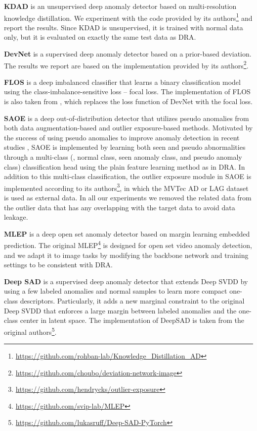 \documentclass[10pt,twocolumn,letterpaper]{article}
\begin{document}
{\noindent\textbf{KDAD} \cite{salehi2021multiresolution} is an unsupervised deep anomaly detector based on multi-resolution knowledge distillation. We experiment with the code provided by its authors\footnote{\url{https://github.com/rohban-lab/Knowledge\_Distillation\_AD}} and report the results. Since KDAD is unsupervised, it is trained with normal data only, but it is evaluated on exactly the same test data as DRA.


\noindent\textbf{DevNet} \cite{pang2019deep,pang2021explainable} is a supervised deep anomaly detector based on a prior-based deviation. The results we report are based on the implementation provided by its authors\footnote{\url{https://github.com/choubo/deviation-network-image}}.


\noindent\textbf{FLOS} \cite{lin2017focalloss} is a deep imbalanced classifier that learns a binary classification model using the class-imbalance-sensitive loss -- focal loss. The implementation of FLOS is also taken from \cite{pang2021explainable}, which replaces the loss function of DevNet with the focal loss.


\noindent\textbf{SAOE} is a deep out-of-distribution detector that utilizes pseudo anomalies from both data augmentation-based and outlier exposure-based methods. Motivated by the success of using pseudo anomalies to improve anomaly detection in recent studies \cite{tack2020csi,li2021cutpaste}, SAOE is implemented by learning both seen and pseudo abnormalities through a multi-class (\ie, normal class, seen anomaly class, and pseudo anomaly class) classification head using the plain feature learning method as in DRA. In addition to this multi-class classification, the outlier exposure module \cite{hendrycks2018deep} in SAOE is implemented according to its authors\footnote{\url{https://github.com/hendrycks/outlier-exposure}}, in which the MVTec AD \cite{Bergmann_2019_CVPR} or LAG \cite{Li_2019_CVPR} dataset is used as external data. In all our experiments we removed the related data from the outlier data that has any overlapping with the target data to avoid data leakage.


\noindent\textbf{MLEP} \cite{liu2019margin} is a deep open set anomaly detector based on margin learning embedded prediction. The original MLEP\footnote{\url{https://github.com/svip-lab/MLEP}} is designed for open set video anomaly detection, and we adapt it to image tasks by modifying the backbone network and training settings to be consistent with DRA.

\noindent\textbf{Deep SAD} \cite{ruff2019deep} is a supervised deep anomaly detector that extends Deep SVDD \cite{ruff2018deep} by using a few labeled anomalies and normal samples to learn more compact one-class descriptors. Particularly, it adds a new marginal constraint to the original Deep SVDD that enforces a large margin between labeled anomalies and the one-class center in latent space. The implementation of DeepSAD is taken from the original authors\footnote{\url{https://github.com/lukasruff/Deep-SAD-PyTorch}}.

}
\end{document}
